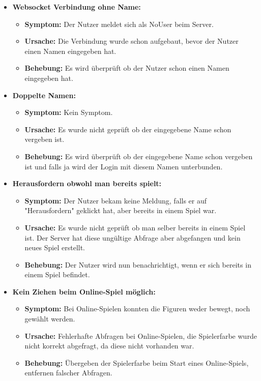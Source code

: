 \documentclass[parskip=full]{scrartcl}
\begin{document}
\begin{itemize}
\item{\textbf{Websocket Verbindung ohne Name:}}
\begin{itemize}
	\item{\textbf{Symptom:}} Der Nutzer meldet sich als NoUser beim Server.
	\item{\textbf{Ursache:}} Die Verbindung wurde schon aufgebaut, bevor der Nutzer einen Namen eingegeben hat.
	\item{\textbf{Behebung:}} Es wird überprüft ob der Nutzer schon einen Namen eingegeben hat.
\end{itemize}

\item{\textbf{Doppelte Namen:}}
\begin{itemize}
	\item{\textbf{Symptom:}} Kein Symptom.
	\item{\textbf{Ursache:}} Es wurde nicht geprüft ob der eingegebene Name schon vergeben ist.
	\item{\textbf{Behebung:}} Es wird überprüft ob der eingegebene Name schon vergeben ist und falls ja wird der Login mit diesem Namen unterbunden.
\end{itemize}

\item{\textbf{Herausfordern obwohl man bereits spielt:}}
\begin{itemize}
	\item{\textbf{Symptom:}} Der Nutzer bekam keine Meldung, falls er auf "Herausfordern" geklickt hat, aber bereits in einem Spiel war.
	\item{\textbf{Ursache:}} Es wurde nicht geprüft ob man selber bereits in einem Spiel ist. Der Server hat diese ungültige Abfrage aber abgefangen und kein neues Spiel erstellt. 
	\item{\textbf{Behebung:}} Der Nutzer wird nun benachrichtigt, wenn er sich bereits in einem Spiel befindet.
\end{itemize}


\item{\textbf{Kein Ziehen beim Online-Spiel möglich:}}
\begin{itemize}
	\item{\textbf{Symptom:}} Bei Online-Spielen konnten die Figuren weder bewegt, noch gewählt werden.
	\item{\textbf{Ursache:}} Fehlerhafte Abfragen bei Online-Spielen, die Spielerfarbe wurde nicht korrekt abgefragt, da diese nicht vorhanden war.
	\item{\textbf{Behebung:}} Übergeben der Spielerfarbe beim Start eines Online-Spiels, entfernen falscher Abfragen.
\end{itemize}

\end{itemize}
\end{document}
